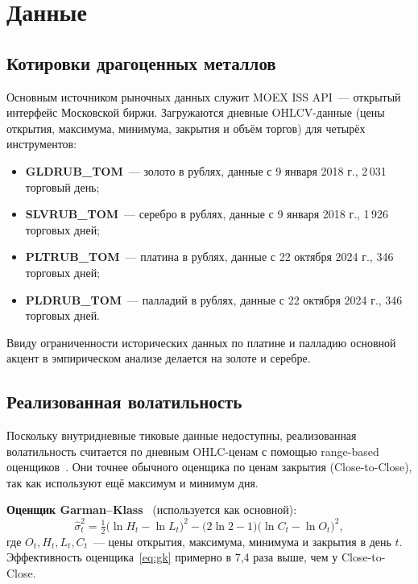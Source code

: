 \section{Данные}

\subsection{Котировки драгоценных металлов}

Основным источником рыночных данных служит MOEX ISS API~---
открытый интерфейс Московской биржи.
Загружаются дневные OHLCV-данные (цены открытия, максимума, минимума, закрытия
и объём торгов) для четырёх инструментов:

\begin{itemize}
    \item \textbf{GLDRUB\_TOM}~--- золото в рублях, данные с 9 января 2018 г.,
          2\,031 торговый день;
    \item \textbf{SLVRUB\_TOM}~--- серебро в рублях, данные с 9 января 2018 г.,
          1\,926 торговых дней;
    \item \textbf{PLTRUB\_TOM}~--- платина в рублях, данные с 22 октября 2024 г.,
          346 торговых дней;
    \item \textbf{PLDRUB\_TOM}~--- палладий в рублях, данные с 22 октября 2024 г.,
          346 торговых дней.
\end{itemize}

Ввиду ограниченности исторических данных по платине и палладию
основной акцент в эмпирическом анализе делается на золоте и серебре.

\subsection{Реализованная волатильность}

Поскольку внутридневные тиковые данные недоступны, реализованная
волатильность считается по дневным OHLC-ценам с помощью range-based
оценщиков~\cite{Garman1980, Parkinson1980}. Они точнее обычного
оценщика по ценам закрытия (Close-to-Close), так как используют ещё
максимум и минимум дня.

\textbf{Оценщик Garman--Klass}~\cite{Garman1980} (используется как основной):
\begin{equation}\label{eq:gk}
    \widehat{\sigma}^2_t = \tfrac{1}{2}\bigl(\ln H_t - \ln L_t\bigr)^2
    - \bigl(2\ln 2 - 1\bigr)\bigl(\ln C_t - \ln O_t\bigr)^2,
\end{equation}
где $O_t, H_t, L_t, C_t$~--- цены открытия, максимума, минимума и закрытия в день $t$.
Эффективность оценщика~\eqref{eq:gk} примерно в 7{,}4 раза выше, чем у Close-to-Close.

